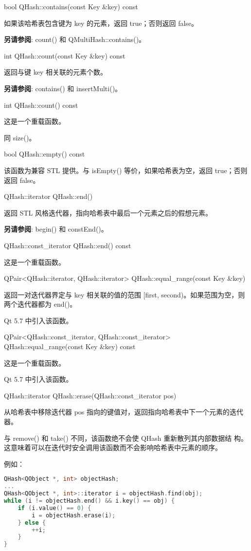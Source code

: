 bool QHash::contains(const Key \&key) const

如果该哈希表包含键为 key 的元素，返回 true；否则返回 false。

\textbf{另请参阅}: count() 和 QMultiHash::contains()。

int QHash::count(const Key \&key) const

返回与键 key 相关联的元素个数。

\textbf{另请参阅}: contains() 和 insertMulti()。

int QHash::count() const

这是一个重载函数。

同 size()。

bool QHash::empty() const

该函数为兼容 STL 提供。与 isEmpty() 等价，如果哈希表为空，返回 true；否则返回 false。

QHash::iterator QHash::end()

返回 STL 风格迭代器，指向哈希表中最后一个元素之后的假想元素。

\textbf{另请参阅}: begin() 和 constEnd()。

QHash::const\_iterator QHash::end() const

这是一个重载函数。

QPair<QHash::iterator, QHash::iterator> QHash::equal\_range(const Key \&key)

返回一对迭代器界定与 key 相关联的值的范围 [first, second)。如果范围为空，则两个迭代器都为 end()。

Qt 5.7 中引入该函数。

QPair<QHash::const\_iterator, QHash::const\_iterator> QHash::equal\_range(const Key \&key) const

这是一个重载函数。

Qt 5.7 中引入该函数。

QHash::iterator QHash::erase(QHash::const\_iterator pos)

从哈希表中移除迭代器 pos 指向的键值对，返回指向哈希表中下一个元素的迭代器。

与 remove() 和 take() 不同，该函数绝不会使 QHash 重新散列其内部数据结
构。这意味着可以在迭代时安全调用该函数而不会影响哈希表中元素的顺序。

例如：

\begin{lstlisting}[language=C++]
QHash<QObject *, int> objectHash;
...
QHash<QObject *, int>::iterator i = objectHash.find(obj);
while (i != objectHash.end() && i.key() == obj) {
    if (i.value() == 0) {
        i = objectHash.erase(i);
    } else {
        ++i;
    }
}
\end{lstlisting}

